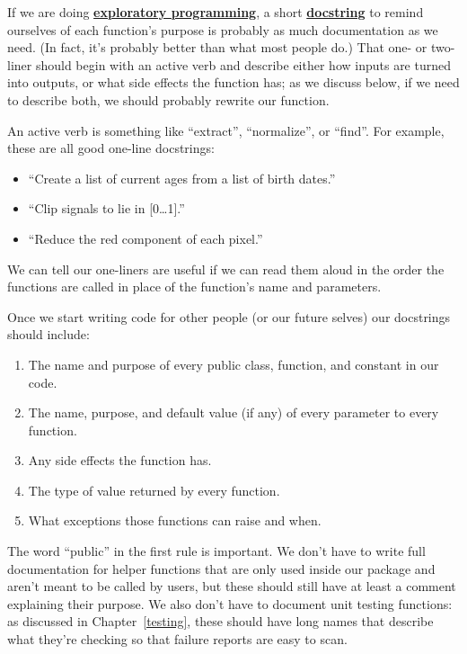 \documentclass[
]{krantz}
\providecommand{\tightlist}{%
  \setlength{\itemsep}{0pt}\setlength{\parskip}{0pt}}
\newcommand{\gref}[2]{\hyperlink{#2}{\textbf{#1}}}
\begin{document}
If we are doing \gref{exploratory programming}{exploratory\_programming},
a short \gref{docstring}{docstring} to remind ourselves of each function's purpose
is probably as much documentation as we need.
(In fact, it's probably better than what most people do.)
That one- or two-liner should begin with an active verb and describe either
how inputs are turned into outputs,
or what side effects the function has;
as we discuss below,
if we need to describe both,
we should probably rewrite our function.

An active verb is something like ``extract'', ``normalize'', or ``find''.
For example,
these are all good one-line docstrings:

\begin{itemize}
\tightlist
\item
  ``Create a list of current ages from a list of birth dates.''
\item
  ``Clip signals to lie in {[}0\ldots1{]}.''
\item
  ``Reduce the red component of each pixel.''
\end{itemize}

We can tell our one-liners are useful if we can read them aloud in the order the functions are called
in place of the function's name and parameters.

Once we start writing code for other people (or our future selves)
our docstrings should include:

\begin{enumerate}
\def\labelenumi{\arabic{enumi}.}
\tightlist
\item
  The name and purpose of every public class, function, and constant in our code.
\item
  The name, purpose, and default value (if any) of every parameter to every function.
\item
  Any side effects the function has.
\item
  The type of value returned by every function.
\item
  What exceptions those functions can raise and when.
\end{enumerate}

The word ``public'' in the first rule is important.
We don't have to write full documentation for helper functions
that are only used inside our package and aren't meant to be called by users,
but these should still have at least a comment explaining their purpose.
We also don't have to document unit testing functions:
as discussed in Chapter~\ref{testing},
these should have long names that describe what they're checking
so that failure reports are easy to scan.
\end{document}
